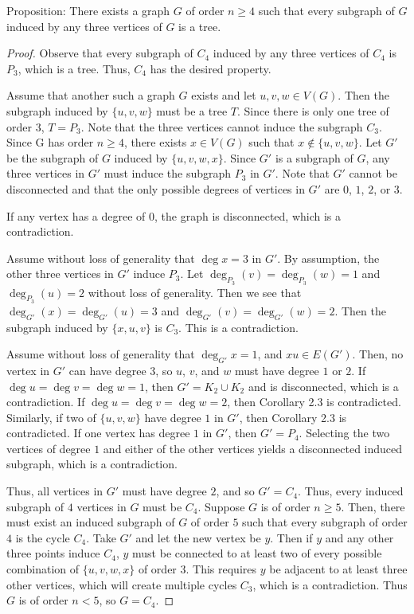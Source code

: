 \documentclass[12pt]{article}
\begin{document}
\newpage{} Proposition: There exists a graph $G$ of order $n \geq 4$ such that every subgraph of $G$ induced by any three vertices of $G$ is a tree.
\begin{proof}
Observe that every subgraph of $C_4$ induced by any three vertices of $C_4$ is $P_3$, which is a tree. Thus, $C_4$ has the desired property. 

Assume that another such a graph $G$ exists and let $u, v, w \in V(G)$. Then the subgraph induced by $\{u, v, w\}$ must be a tree $T$. Since there is only one tree of order 3, $T = P_3$. Note that the three vertices cannot induce the subgraph $C_3$. Since G has order $n \geq 4$, there exists $x \in V(G)$ such that $x \notin \{u,v,w\}$. Let $G'$ be the subgraph of $G$ induced by $\{u, v, w, x\}$. Since $G'$ is a subgraph of $G$, any three vertices in $G'$ must induce the subgraph $P_3$ in $G'$. Note that $G'$ cannot be disconnected and that the only possible degrees of vertices in $G'$ are $0$, $1$, $2$, or $3$. 

If any vertex has a degree of $0$, the graph is disconnected, which is a contradiction.

Assume without loss of generality that $\deg x = 3$ in $G'$. By assumption, the other three vertices in $G'$ induce $P_3$. Let $\deg_{P_3}(v) = \deg_{P_3}(w) = 1$ and $\deg_{P_3}(u) = 2$ without loss of generality. Then we see that $\deg_{G'}(x) = \deg_{G'}(u) = 3$ and $\deg_{G'}(v) = \deg_{G'}(w) = 2$. Then the subgraph induced by $\{x, u, v\}$ is $C_3$. This is a contradiction.

Assume without loss of generality that $\deg_{G'}x = 1$, and $xu \in E(G')$. Then, no vertex in $G'$ can have degree 3, so $u$, $v$, and $w$ must have degree $1$ or $2$. If $\deg u = \deg v = \deg w = 1$, then $G' = K_2 \cup K_2$ and is disconnected, which is a contradiction. If $\deg u = \deg v = \deg w = 2$, then Corollary 2.3 is contradicted. Similarly, if two of $\{u,v,w\}$ have degree $1$ in $G'$, then Corollary 2.3 is contradicted. If one vertex has degree $1$ in $G'$, then $G' = P_4$. Selecting the two vertices of degree $1$ and either of the other vertices yields a disconnected induced subgraph, which is a contradiction.

Thus, all vertices in $G'$ must have degree $2$, and so $G' = C_4$. Thus, every induced subgraph of $4$ vertices in $G$ must be $C_4$. Suppose $G$ is of order $n \geq 5$. Then, there must exist an induced subgraph of $G$ of order $5$ such that every subgraph of order $4$ is the cycle $C_4$. Take $G'$ and let the new vertex be $y$. Then if $y$ and any other three points induce $C_4$, $y$ must be connected to at least two of every possible combination of $\{u, v, w, x\}$ of order $3$. This requires $y$ be adjacent to at least three other vertices, which will create multiple cycles $C_3$, which is a contradiction. Thus $G$ is of order $n < 5$, so $G = C_4$.
\end{proof}
\end{document}
